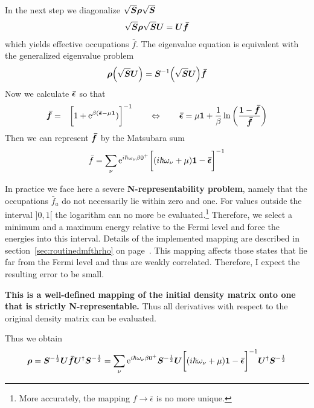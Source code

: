 \documentclass[11pt,a4paper]{report}
\begin{document}
In the next step we diagonalize $\sqrt{\bm{S}}\bm{\rho}\sqrt{\bm{S}}$
\begin{eqnarray}
\sqrt{\bm{S}}\bm{\rho}\sqrt{\bm{S}}\bm{U}=\bm{U}\bm{\bar{f}}
\end{eqnarray}
which yields effective occupations $\bar{f}$. The eigenvalue equation
is equivalent with the generalized eigenvalue problem
\begin{eqnarray}
\bm{\rho}\Bigl(\sqrt{\bm{S}}\bm{U}\Bigr)=\bm{S}^{-1}\Bigl(\sqrt{\bm{S}}\bm{U}\Bigr)\bm{\bar{f}}
\end{eqnarray}
Now we calculate $\bm{\bar{\epsilon}}$ so that
\begin{eqnarray}
\bm{\bar{f}}
&=&\biggl[1+\mathrm{e}^{\beta(\bm{\bar{\epsilon}}-\mu\bm{1}})\biggr]^{-1}
\qquad\Leftrightarrow\qquad
\bm{\bar{\epsilon}}=\mu\bm{1}
+\frac{1}{\beta}\ln\left(\frac{\bm{1}-\bm{\bar{f}}}{\bm{\bar{f}}}\right)
\end{eqnarray}
Then we can represent $\bm{\bar{f}}$ by the Matsubara sum
\begin{eqnarray}
\bar{f}=\sum_\nu\mathrm{e}^{i\hbar\omega_\nu\beta0^+}
\biggl[(i\hbar\omega_\nu+\mu)\bm{1}-\bm{\bar{\epsilon}}\biggr]^{-1}
\end{eqnarray}

In practice we face here a severe \textbf{N-representability
  problem}, namely that the
occupations $\bar{f}_a$ do not necessarily lie within zero and one.
For values outside the interval $]0,1[$ the logarithm can no more be
    evaluated.\footnote{More accurately, the mapping $f\rightarrow
      \bar{\epsilon}$ is no more unique.} Therefore, we select a
    minimum and a maximum energy relative to the Fermi level and force
    the energies into this interval. Details of the implemented
    mapping are described in section~\ref{sec:routinedmfthrho} on
    page~\pageref{sec:routinedmfthrho}.  This mapping affects those
    states that lie far from the Fermi level and thus are weakly
    correlated. Therefore, I expect the resulting error to be small.

\textbf{This is a well-defined mapping of the initial density matrix
  onto one that is strictly N-representable.} Thus all derivatives
with respect to the original density matrix can be evaluated.

Thus we obtain
\begin{eqnarray}
\bm{\rho}=\bm{S}^{-\frac{1}{2}}\bm{U}\bm{\bar{f}}\bm{U}^\dagger\bm{S}^{-\frac{1}{2}}
=\sum_\nu\mathrm{e}^{i\hbar\omega_\nu\beta0^+}
\bm{S}^{-\frac{1}{2}}\bm{U}\biggl[(i\hbar\omega_\nu+\mu)\bm{1}
-\bm{\bar{\epsilon}}\biggr]^{-1}\bm{U}^\dagger\bm{S}^{-\frac{1}{2}}
\end{eqnarray}
\end{document}
